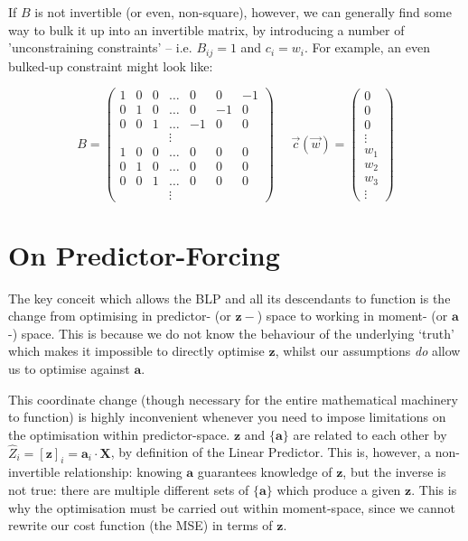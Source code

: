\documentclass[]{article}
\begin{document}
		If $B$ is not invertible (or even, non-square), however, we can generally find some way to bulk it up into an invertible matrix, by introducing a number of 'unconstraining constraints' -- i.e. $B_{ij} = 1$ and $c_i = w_i$. For example, an even bulked-up constraint might look like:

		\begin{equation}
			B = \begin{pmatrix}
				1 & 0 & 0 & \hdots & 0& 0  & -1
				\\
				0 & 1 & 0 & \hdots & 0 & -1 & 0
				\\
				0 & 0 & 1 & \hdots & -1 & 0 & 0
				\\
				&&&\vdots&&&
				\\
				1 & 0 & 0 & \hdots & 0 & 0 & 0
				\\
				0 & 1 & 0 & \hdots & 0 & 0 & 0
				\\
				0 & 0 & 1 & \hdots & 0 & 0 & 0
				\\&&&\vdots&&&
			\end{pmatrix}~~~~~~\vec{c}(\vec{w}) = \begin{pmatrix}
				0
				\\
				0
				\\
				0
				\\
				\vdots
				\\
				w_1
				\\
				w_2
				\\
				w_3
				\\
				\vdots\end{pmatrix}
		\end{equation}
	\clearpage
	\renewcommand\vec[1]
	{
		\boldsymbol{\mathbf{#1}}
	}
	\section{On Predictor-Forcing}

		The key conceit which allows the BLP and all its descendants to function is the change from optimising in predictor- (or $\vec{z}-$) space to working in moment- (or $\vec{a}$-) space. This is because we do not know the behaviour of the underlying `truth' which makes it impossible to directly optimise $\vec{z}$, whilst our assumptions \textit{do} allow us to optimise against $\vec{a}$.

		This coordinate change (though necessary for the entire mathematical machinery to function) is highly inconvenient whenever you need to impose limitations on the optimisation within predictor-space. $\vec{z}$ and $\{\vec{a}\}$ are related to each other by $\hat{Z}_i = [\vec{z}]_i = \vec{a}_i \cdot \vec{X}$, by definition of the Linear Predictor. This is, however, a non-invertible relationship: knowing $\vec{a}$ guarantees knowledge of $\vec{z}$, but the inverse is not true: there are multiple different sets of $\{\vec{a}\}$ which produce a given $\vec{z}$. This is why the optimisation must be carried out within moment-space, since we cannot rewrite our cost function (the MSE) in terms of $\vec{z}$.
\end{document}
